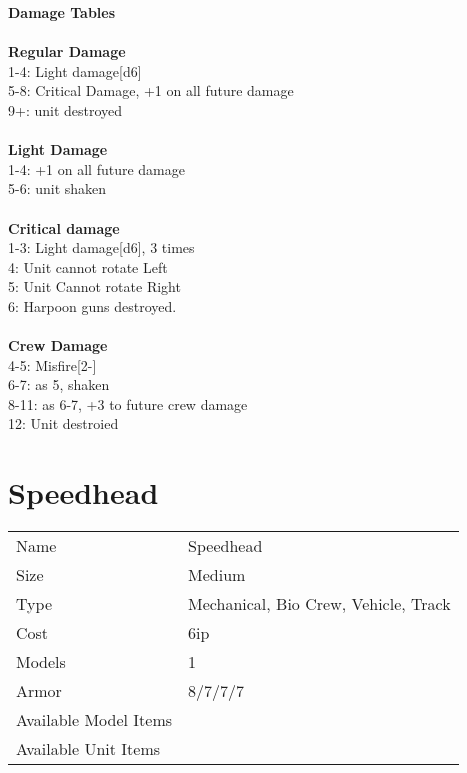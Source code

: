 {\bf Damage Tables} \\
\ \\ {\bf Regular Damage } \\
1-4: Light damage[d6] \\
5-8: Critical Damage, +1 on all future damage \\
9+: unit destroyed \\
\ \\ {\bf Light Damage } \\
1-4: +1 on all future damage \\
5-6: unit shaken \\
\ \\ {\bf Critical damage } \\
1-3: Light damage[d6], 3 times \\
4: Unit cannot rotate Left \\
5: Unit Cannot rotate Right \\
6: Harpoon guns destroyed. \\
\ \\ {\bf Crew Damage } \\
4-5: Misfire[2-] \\
6-7: as 5, shaken \\
8-11: as 6-7, +3 to future crew damage \\
12: Unit destroied \\









\pagebreak

\section{ Speedhead }

\begin{tabular}{ll}
  Name & Speedhead \\
  Size & Medium\\
  Type & Mechanical, Bio Crew, Vehicle, Track\\
  Cost & 6ip\\
  Models & 1\\
  Armor & 8/7/7/7\\
  Available Model Items &  \\
  Available Unit Items &  \\
\end{tabular}

